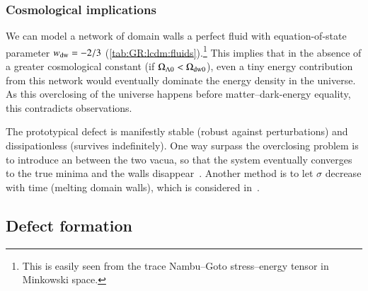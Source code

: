     \subsubsection{Cosmological implications}
        We can model a network of domain walls a perfect fluid with equation-of-state parameter $w_\mathrm{dw}= -2/3$ (\cref{tab:GR:lcdm:fluids}).\footnote{This is easily seen from the trace Nambu--Goto stress--energy tensor in Minkowski space.} This implies that in the absence of a greater cosmological constant (if $\Omega_{\Lambda 0} < \Omega_\mathrm{dw0}$), 
        even a tiny energy contribution from this network would eventually dominate the energy density in the universe. As this overclosing of the universe happens before matter--dark-energy equality, this contradicts observations.

        The prototypical defect is manifestly stable (robust against perturbations) and dissipationless (survives indefinitely). One way surpass the overclosing problem is to introduce an  between the two vacua, so that the system eventually converges to the true minima and the walls disappear~\citep{saikawaReviewGravitationalWaves2017}. Another method is to let $\sigma$ decrease with time (melting domain walls), which is considered in~\citet{babichevNANOGravSpectralIndex2023}.


















\subsection{Defect formation}\label{sec:cosmo:defects:formation}

